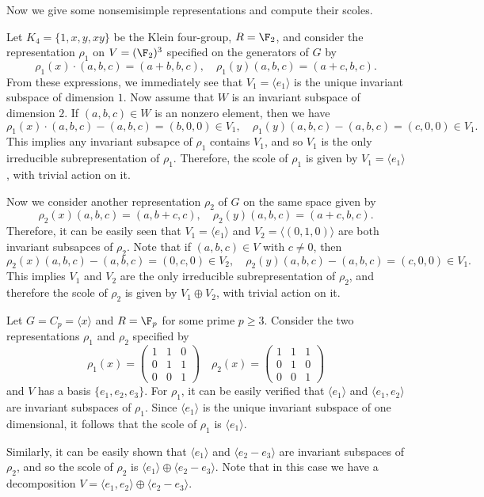 Now we give some nonsemisimple representations and compute their scoles.
\begin{example}
Let $K_4=\{1,x,y,xy\}$ be the Klein four-group, $R=\F_2$, and consider the representation $\rho_1$ on $V=(\F_2)^3$ specified on the generators of $G$ by
\[\rho_1(x)\cdot(a,b,c)=(a+b,b,c),\quad\rho_1(y)(a,b,c)=(a+c,b,c).\]
From these expressions, we immediately see that $V_1=\langle e_1\rangle$ is the unique invariant subspace of dimension $1$. Now assume that $W$ is an invariant subspace of dimension $2$. If $(a,b,c)\in W$ is an nonzero element, then we have
\[\rho_1(x)\cdot(a,b,c)-(a,b,c)=(b,0,0)\in V_1,\quad \rho_1(y)(a,b,c)-(a,b,c)=(c,0,0)\in V_1.\]
This implies any invariant subsapce of $\rho_1$ contains $V_1$, and so $V_1$ is the only irreducible subrepresentation of $\rho_1$. Therefore, the scole of $\rho_1$ is given by $V_1=\langle e_1\rangle$, with trivial action on it.\par
Now we consider another representation $\rho_2$ of $G$ on the same space given by
\[\rho_2(x)(a,b,c)=(a,b+c,c),\quad \rho_2(y)(a,b,c)=(a+c,b,c).\]
Therefore, it can be easily seen that $V_1=\langle e_1\rangle$ and $V_2=\langle(0,1,0)\rangle$ are both invariant subsapces of $\rho_2$. Note that if $(a,b,c)\in V$ with $c\neq 0$, then
\[\rho_2(x)(a,b,c)-(a,b,c)=(0,c,0)\in V_2,\quad\rho_2(y)(a,b,c)-(a,b,c)=(c,0,0)\in V_1.\]
This implies $V_1$ and $V_2$ are the only irreducible subrepresentation of $\rho_2$, and therefore the scole of $\rho_2$ is given by $V_1\oplus V_2$, with trivial action on it.
\end{example}
\begin{example}\label{representation of C_p on F_p}
Let $G=C_p=\langle x\rangle$ and $R=\F_p$ for some prime $p\geq 3$. Consider the two representations $\rho_1$ and $\rho_2$ specified by
\[\rho_1(x)=\begin{pmatrix}
1&1&0\\
0&1&1\\
0&0&1
\end{pmatrix}\quad\rho_2(x)=\begin{pmatrix}
1&1&1\\
0&1&0\\
0&0&1
\end{pmatrix}\]
and $V$ has a basis $\{e_1,e_2,e_3\}$. For $\rho_1$, it can be easily verified that $\langle e_1\rangle$ and $\langle e_1,e_2\rangle$ are invariant subspaces of $\rho_1$. Since $\langle e_1\rangle$ is the unique invariant subspace of one dimensional, it follows that the scole of $\rho_1$ is $\langle e_1\rangle$.\par
Similarly, it can be easily shown that $\langle e_1\rangle$ and $\langle e_2-e_3\rangle$ are invariant subspaces of $\rho_2$, and so the scole of $\rho_2$ is $\langle e_1\rangle\oplus\langle e_2-e_3\rangle$. Note that in this case we have a decomposition $V=\langle e_1,e_2\rangle\oplus\langle e_2-e_3\rangle$.
\end{example}
